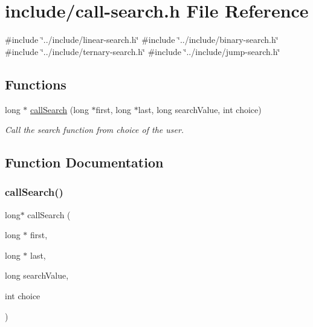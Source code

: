 \hypertarget{call-search_8h}{}\section{include/call-\/search.h File Reference}
\label{call-search_8h}
{\ttfamily \#include \char`\"{}../include/linear-\/search.\+h\char`\"{}}\newline
{\ttfamily \#include \char`\"{}../include/binary-\/search.\+h\char`\"{}}\newline
{\ttfamily \#include \char`\"{}../include/ternary-\/search.\+h\char`\"{}}\newline
{\ttfamily \#include \char`\"{}../include/jump-\/search.\+h\char`\"{}}\newline
\subsection*{Functions}
\begin{DoxyCompactItemize}
\item 
long $\ast$ \mbox{\hyperlink{call-search_8h_aa4c0ed6a64776cb3d018dff7a5077c4b}{call\+Search}} (long $\ast$first, long $\ast$last, long search\+Value, int choice)
\begin{DoxyCompactList}\small\item\em Call the search function from choice of the user. \end{DoxyCompactList}\end{DoxyCompactItemize}


\subsection{Function Documentation}
\mbox{\label{call-search_8h_aa4c0ed6a64776cb3d018dff7a5077c4b}} 
\subsubsection{\texorpdfstring{callSearch()}{callSearch()}}
{\footnotesize\ttfamily long$\ast$ call\+Search (\begin{DoxyParamCaption}\item[{long $\ast$}]{first,  }\item[{long $\ast$}]{last,  }\item[{long}]{search\+Value,  }\item[{int}]{choice }\end{DoxyParamCaption})}



